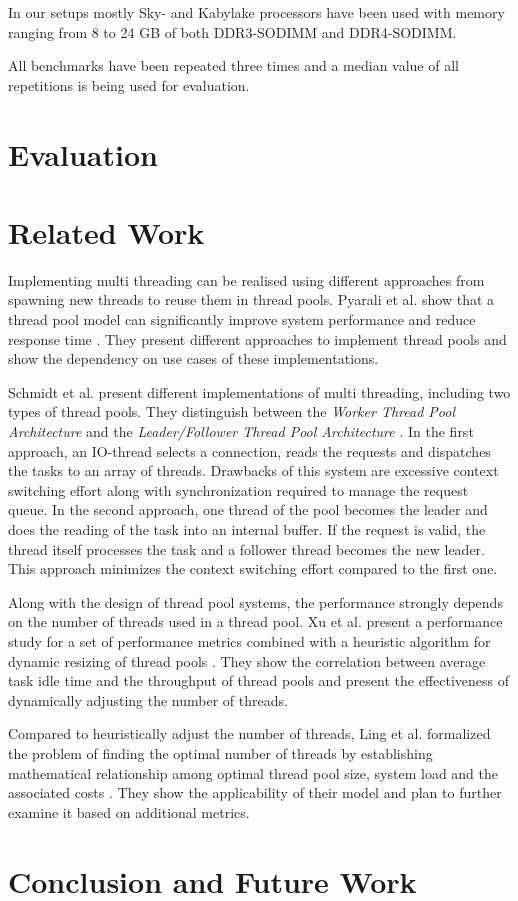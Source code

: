 \documentclass[conference]{IEEEtran}
\begin{document}
In our setups mostly Sky- and Kabylake processors have been used with memory
ranging from 8 to 24 GB of both DDR3-SODIMM and DDR4-SODIMM.

All benchmarks have been repeated three times and a median value of all
repetitions is being used for evaluation.

\section{Evaluation}

\section{Related Work}
Implementing multi threading can be realised using different approaches from spawning new threads to reuse them in thread pools. Pyarali et al. show that a thread pool model can significantly improve system performance and reduce response time \cite{pyarali2001evaluating}. They present different approaches to implement thread pools and show the dependency on use cases of these implementations.

Schmidt et al. present different implementations of multi threading, including two types of thread pools. They distinguish between the \emph{Worker Thread Pool Architecture} and the \emph{Leader/Follower Thread Pool Architecture} \cite{schmidt1998evaluating}. In the first approach, an IO-thread selects a connection, reads the requests and dispatches the tasks to an array of threads. Drawbacks of this system are excessive context switching effort along with synchronization required to manage the request queue. In the second approach, one thread of the pool becomes the leader and does the reading of the task into an internal buffer. If the request is valid, the thread itself processes the task and a follower thread becomes the new leader. This approach minimizes the context switching effort compared to the first one.

Along with the design of thread pool systems, the performance strongly depends on the number of threads used in a thread pool. Xu et al. present a performance study for a set of performance metrics combined with a heuristic algorithm for dynamic resizing of thread pools \cite{xu2004performance}. They show the correlation between average task idle time and the throughput of thread pools and present the effectiveness of dynamically adjusting the number of threads.

Compared to heuristically adjust the number of threads, Ling et al. formalized the problem of finding the optimal number of threads by establishing mathematical relationship among optimal thread pool size, system load and the associated costs \cite{ling2000analysis}. They show the applicability of their model and plan to further examine it based on additional metrics.
\section{Conclusion and Future Work}



\end{document}
